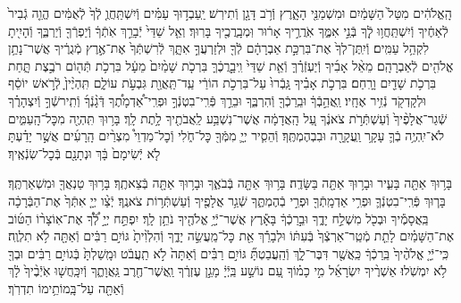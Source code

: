 \documentclass[twoside, openany, parskip=half, 11pt]{book}
\begin{document}
הָֽאֱלֹהִ֔ים מִטַּל֙ הַשָּׁמַ֔יִם וּמִשְׁמַנֵּ֖י הָאָ֑רֶץ וְֿרֹ֥ב דָּגָ֖ן וְֿתִירֽשׁ׃ יַֽעַבְד֣וּךָ עַמִּ֗ים וְֿיִשְׁתַּֽחֲוֻ֤ לְֿךָ֙ לְֿאֻמִּ֔ים הֱוֵ֤ה גְֿבִיר֙ לְֿאַחֶ֔יךָ וְֿיִשְׁתַּֽחֲו֥וּ לְֿ֖ךָ בְּֿנֵ֣י אִמֶּ֑ךָ אֹֽרֲרֶ֣יךָ אָר֔וּר וּֽמְבָֽרֲכֶ֖יךָ בָּרֽוּךְ׃ וְאֵ֤ל שַׁדַּי֙ יְֿבָרֵ֣ךְ אֹֽתְֿךָ֔ וְֿיַפְרְֿךָ֖ וְֿיַרְבֶּ֑ךָ וְֿהָיִ֖יתָ לִקְהַ֥ל עַמִּֽים׃ וְֿיִֽתֶּן־לְךָ֙ אֶת־בִּרְכַּ֣ת אַבְרָהָ֔ם לְֿךָ֖ וּלְזַרְעֲךָ֣ אִתָּ֑ךְ לְֿרִשְׁתְּֿךָ֙ אֶת־אֶ֣רֶץ מְֿגֻרֶ֔יךָ אֲשֶׁר־נָתַ֥ן אֱלֹהִ֖ים לְֿאַבְרָהָֽם׃ מֵאֵ֨ל אָבִ֜יךָ וְֿיַעְזְֿרֶ֗ךָּ וְֿאֵ֤ת שַׁדַּי֙ וִֽיבָ֣רֲכֶ֔ךָּ בִּרְכֹ֤ת שָׁמַ֨יִם֙ מֵעָ֔ל בִּרְכֹ֥ת תְּֿה֖וֹם רֹבֶ֣צֶת תָּ֑חַת בִּרְכֹ֥ת שָׁדַ֖יִם וָרָֽחַם׃ בִּרְכֹ֣ת אָבִ֗יךָ גָּֽבְֿרוּ֙ עַל־בִּרְכֹ֣ת הוֹרַ֔י עַֽד־תַּֽאֲוַ֖ת גִּבְעֹ֣ת עוֹלָ֑ם תִּֽהְיֶ֨יןָ֙ לְֿרֹ֣אשׁ יוֹסֵ֔ף וּלְקָדְקֹ֖ד נְֿזִ֥יר אֶחָֽיו׃
וַֽאֲהֵ֣בְֿךָ֔ וּבֵֽרַכְֿךָ֖ וְֿהִרְבֶּ֑ךָ וּבֵרַ֣ךְ פְּֿרִֽי־בִטְנְֿךָ֣ וּפְרִֽי־אַ֠דְמָתֶ֠ךָ דְּֿגָ֨נְֿךָ֜ וְֿתִֽירשְֿׁךָ֣ וְֿיִצְהָרֶ֗ךָ שְֿׁגַר־אֲלָפֶ֨יךָ֙ וְֿעַשְׁתְּֿרֹ֣ת צֹאנֶ֔ךָ עַ֚ל הָֽאֲדָמָ֔ה אֲשֶׁר־נִשְׁבַּ֥ע לַֽאֲבֹתֶ֖יךָ לָ֥תֶת לָֽךְ׃ בָּר֥וּךְ תִּֽהְיֶ֖ה מִכׇּל־הָֽעַמִּ֑ים לֹא־יִֽהְיֶ֥ה בְֿךָ֛ עָקָ֥ר וַֽעֲקָרָ֖ה וּבִבְהֶמְתֶּֽךָ׃ וְֿהֵסִ֧יר יְיָ֛ מִמְּֿךָ֖ כׇּל־חֹ֑לִי וְֿכׇל־מַדְוֵי֩ מִצְרַ֨יִם הָֽרָעִ֜ים אֲשֶׁ֣ר יָדַ֗עְתָּ לֹ֤א יְֿשִׂימָם֙ בָּ֔ךְ וּנְתָנָ֖ם בְּֿכׇל־שֽׂנְֿאֶֽיךָ׃

בָּר֥וּךְ אַתָּ֖ה בָּעִ֑יר וּבָר֥וּךְ אַתָּ֖ה בַּשָּׂדֶֽה׃ בָּר֥וּךְ אַתָּ֖ה בְּֿבֹאֶ֑ךָ וּבָר֥וּךְ אַתָּ֖ה בְּֿצֵאתֶֽךָ׃ בָּר֥וּךְ טַנְאֲךָ֖ וּמִשְׁאַרְתֶּֽךָ׃ בָּר֧וּךְ פְּֿרִֽי־בִטְנְֿךָ֛ וּפְרִ֥י אַדְמָֽתְֿךָ֖ וּפְרִ֣י בְֿהֶמְתֶּ֑ךָ שְֿׁגַ֥ר אֲלָפֶ֖יךָ וְֿעַשְׁתְּֿר֥וֹת צֹאנֶֽךָ׃ יְֿצַ֨ו יְיָ֤ אִתְּֿךָ֙ אֶת־הַבְּֿרָכָ֔ה בַּֽאֲסָמֶ֕יךָ וּבְכֹ֖ל מִשְׁלַ֣ח יָדֶ֑ךָ וּבֵ֣רַכְֿךָ֔ בָּאָ֕רֶץ אֲשֶׁר־יְֿיָ֥ אֱלֹהֶ֖יךָ נֹתֵ֥ן לָֽךְ׃ יִפְתַּ֣ח יְיָ֣ לְֿ֠ךָ֠ אֶת־אֽוֹצָר֨וֹ הַטּ֜וֹב אֶת־הַשָּׁמַ֗יִם לָתֵ֤ת מְֿטַֽר־אַרְצְֿךָ֙ בְּֿעִתּ֔וֹ וּלְבָרֵ֕ךְ אֵ֖ת כׇּל־מַֽעֲשֵׂ֣ה יָדֶ֑ךָ וְֿהִלְוִ֨יתָ֙ גּוֹיִ֣ם רַבִּ֔ים וְֿאַתָּ֖ה לֹ֥א תִלְוֶֽה׃ כִּֽי־יְֿיָ֤ אֱלֹהֶ֨יךָ֙ בֵּֽרַכְֿךָ֔ כַּֽאֲשֶׁ֖ר דִּבֶּר־לָ֑ךְ וְֿהַֽעֲבַטְתָּ֞ גּוֹיִ֣ם רַבִּ֗ים וְֿאַתָּה֙ לֹ֣א תַֽעֲבֹ֔ט וּמָֽשַׁלְתָּ֙ בְּֿגוֹיִ֣ם רַבִּ֔ים וּבְךָ֖ לֹ֥א יִמְשֹֽׁלוּ׃
אַשְׁרֶ֨יךָ יִשְׂרָאֵ֜ל מִ֣י כָמ֗וֹךָ עַ֚ם נוֹשַׁ֣ע בַּֽיְֿיָ֔ מָגֵ֣ן עֶזְרֶ֔ךָ וַֽאֲשֶׁר־חֶ֖רֶב גַּֽאֲוָתֶ֑ךָ וְֿיִכָּֽחֲשׁ֤וּ אֹֽיְֿבֶ֨יךָ֙ לָ֔ךְ וְֿאַתָּ֖ה עַל־בָּֽמוֹתֵ֥ימוֹ תִדְרֹֽךְ׃
\end{document}
